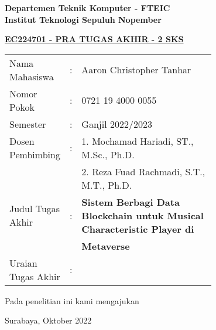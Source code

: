 \begin{flushleft}
  \textbf{Departemen Teknik Komputer - FTEIC}\\
  \textbf{Institut Teknologi Sepuluh Nopember}\\
\end{flushleft}

\begin{center}
  \underline{\textbf{EC224701 - PRA TUGAS AKHIR - 2 SKS}}
\end{center}

\begin{adjustwidth}{-0.2cm}{}
  \begin{tabular}{lcp{0.7\linewidth}}

    Nama Mahasiswa &:& Aaron Christopher Tanhar \\
    Nomor Pokok &:& 0721 19 4000 0055 \\

    Semester &:& Ganjil 2022/2023 \\

    Dosen Pembimbing &:& 1. Mochamad Hariadi, ST., M.Sc., Ph.D. \\
    & & 2. Reza Fuad Rachmadi, S.T., M.T., Ph.D. \\

    Judul Tugas Akhir &:& \textbf{Sistem Berbagi Data Blockchain untuk Musical Characteristic Player di} \\
    & & \textbf{Metaverse} \\

    Uraian Tugas Akhir &:& \\
  \end{tabular}
\end{adjustwidth}

Pada penelitian ini kami mengajukan \lipsum[1][1-10]
\vspace{1ex}

\begin{flushright}
  Surabaya, Oktober 2022
\end{flushright}
\vspace{1ex}

